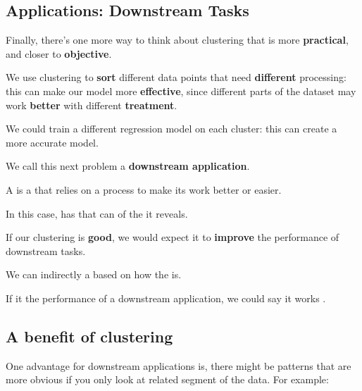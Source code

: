     \subsection{Applications: Downstream Tasks}
    
        Finally, there's one more way to think about clustering that is more \textbf{practical}, and closer to \textbf{objective}.
        
        We use clustering to \textbf{sort} different data points that need \textbf{different} processing: this can make our model more \textbf{effective}, since different parts of the dataset may work \textbf{better} with different \textbf{treatment}.
        
        \miniex We could train a different regression model on each cluster: this can create a more accurate model.
        
        We call this next problem a \textbf{downstream application}.\\
        
        \begin{definition}
            A  is a  that relies on a  process to make its work better or easier.
            
            In this case,  has  that can  of the  it reveals.
        \end{definition}
        
        If our clustering is \textbf{good}, we would expect it to \textbf{improve} the performance of downstream tasks.\\
        
        \begin{concept}
            We can indirectly  a  based on how  the  is.
            
            If it  the performance of a downstream application, we could say it works .
        \end{concept}
        
    \subsection{A benefit of clustering}
    
        One advantage for downstream applications is, there might be patterns that are more obvious if you only look at related segment of the data. For example:
        
